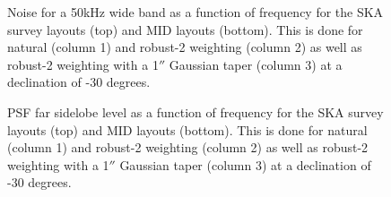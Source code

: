 \documentclass[sfheadings,a4paper,times,9pt,floats,floatfix]{article}
\begin{document}
\begin{figure}[H]
%  
 
%  
 \caption{Noise for a 50kHz wide band as a function of frequency for the SKA survey layouts (top) and MID layouts
(bottom). This is done for natural (column 1) and robust-2 weighting (column 2) as well as robust-2 weighting  with a
1$''$ Gaussian taper (column 3) at a declination of -30 degrees.}\label{fig:full-noise50k}
\end{figure}

\begin{figure}[H]
%  
 
%  
 \caption{PSF far sidelobe level as a function of frequency for the SKA survey layouts (top) and MID layouts (bottom).
This is done for natural (column 1) and robust-2 weighting (column 2) as well as robust-2 weighting  with a 1$''$
Gaussian taper (column 3) at a declination of -30 degrees.}\label{fig:full-sdl}
\end{figure}
\end{document}
